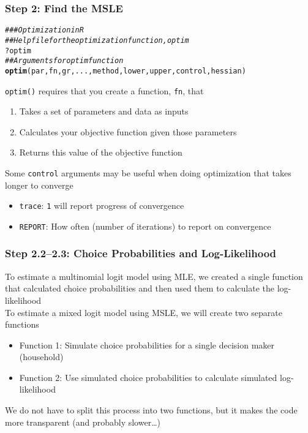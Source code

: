 \documentclass{beamer}\usepackage[]{graphicx}\usepackage[]{color}
\makeatletter
\newcommand{\hlcom}[1]{\textcolor[rgb]{0.678,0.584,0.686}{\textit{#1}}}%
\newcommand{\hlopt}[1]{\textcolor[rgb]{0,0,0}{#1}}%
\newcommand{\hlstd}[1]{\textcolor[rgb]{0.345,0.345,0.345}{#1}}%
\newcommand{\hlkwd}[1]{\textcolor[rgb]{0.737,0.353,0.396}{\textbf{#1}}}%
\newenvironment{kframe}{%
 \def\at@end@of@kframe{}%
 \ifinner\ifhmode%
  \def\at@end@of@kframe{\end{minipage}}%
  \begin{minipage}{\columnwidth}%
 \fi\fi%
 \def\FrameCommand##1{\hskip\@totalleftmargin \hskip-\fboxsep
 \colorbox{shadecolor}{##1}\hskip-\fboxsep
     \hskip-\linewidth \hskip-\@totalleftmargin \hskip\columnwidth}%
 \MakeFramed {\advance\hsize-\width
   \@totalleftmargin\z@ \linewidth\hsize
   \@setminipage}}%
 {\par\unskip\endMakeFramed%
 \at@end@of@kframe}
\newenvironment{knitrout}{}{} %
\makeatother
\begin{document}
\begin{frame}[fragile]\frametitle{Step 2: Find the MSLE}
\begin{knitrout}\footnotesize
{}\color{fgcolor}\begin{kframe}
\begin{alltt}
\hlcom{### Optimization in R}
\hlcom{## Help file for the optimization function, optim}
\hlopt{?}\hlstd{optim}
\hlcom{## Arguments for optim function}
\hlkwd{optim}\hlstd{(par, fn, gr, ..., method, lower, upper, control, hessian)}
\end{alltt}
\end{kframe}
\end{knitrout}
    \vspace{2ex}
	\texttt{optim()} requires that you create a function, \texttt{fn}, that
	\begin{enumerate}
		\item Takes a set of parameters and data as inputs
		\item Calculates your objective function given those parameters
		\item Returns this value of the objective function
	\end{enumerate}
	\vspace{2ex}
	Some \texttt{control} arguments may be useful when doing optimization that takes longer to converge
	\begin{itemize}
		\item \texttt{trace}: \texttt{1} will report progress of convergence
		\item \texttt{REPORT}: How often (number of iterations) to report on convergence
	\end{itemize}
\end{frame}

\begin{frame}\frametitle{Step 2.2--2.3: Choice Probabilities and Log-Likelihood}
    To estimate a multinomial logit model using MLE, we created a single function that calculated choice probabilities and then used them to calculate the log-likelihood \\
    \vspace{2ex}
    To estimate a mixed logit model using MSLE, we will create two separate functions
    \begin{itemize}
    	\item Function 1: Simulate choice probabilities for a single decision maker (household)
    	\item Function 2: Use simulated choice probabilities to calculate simulated log-likelihood
    \end{itemize}
    \vspace{2ex}
    We do not have to split this process into two functions, but it makes the code more transparent (and probably slower\ldots)
\end{frame}
\end{document}
